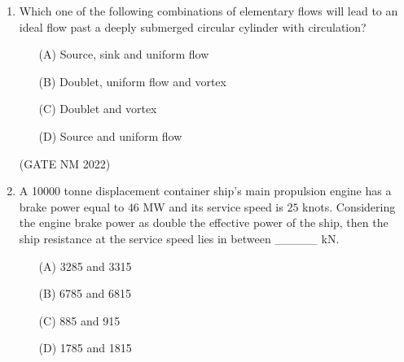 \documentclass[journal,12pt,onecolumn]{IEEEtran}
\theoremstyle{remark}
\begin{document}
\begin{enumerate}
\begin{multicols}{4}
\begin{enumerate}
    \item[(A)] $\sin^{-1}\!\left(\frac{a}{g}\right)$
    \item[(B)] $\tan^{-1}\!\left(\frac{g}{a}\right)$
    \item[(C)] $\tan^{-1}\!\left(\frac{a}{g}\right)$
    \item[(D)] $\sin^{-1}\!\left(\frac{g}{a}\right)$
\end{enumerate}

	\end{multicols}

\hfill(GATE NM 2022)





\item  Which one of the following combinations of elementary flows will lead to an ideal flow past a deeply submerged circular cylinder with circulation?

\begin{enumerate}
    \item[(A)] Source, sink and uniform flow
    \item[(B)] Doublet, uniform flow and vortex
    \item[(C)] Doublet and vortex
    \item[(D)] Source and uniform flow
\end{enumerate}


\hfill(GATE NM 2022)





\item  A 10000 tonne displacement container ship's main propulsion engine has a brake power equal to $46$ MW  and its service speed is $25$ knots. Considering the engine brake power as double the effective power of the ship, then the ship resistance at the service speed lies in between \_\_\_\_\_  kN.

	\begin{multicols}{2}

\begin{enumerate}
    \item[(A)] 3285 and 3315
    \item[(B)] 6785 and 6815
    \item[(C)] 885 and 915
    \item[(D)] 1785 and 1815
\end{enumerate}

	\end{multicols}


\end{enumerate}
\end{document}
